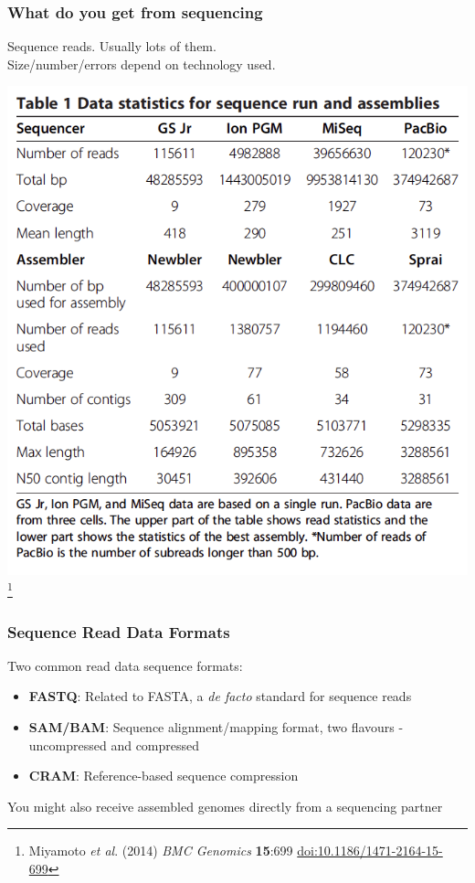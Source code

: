 
\begin{frame}
  \frametitle{What do you get from sequencing}
  Sequence reads. Usually lots of them. \\
  Size/number/errors depend on technology used.
    \begin{center}
      \includegraphics[height=0.6\textheight]{images/miyamoto_table}\footnote{\tiny{Miyamoto \textit{et al}. (2014) \textit{BMC Genomics} \textbf{15}:699 \href{http://dx.doi.org/10.1186/1471-2164-15-699}{doi:10.1186/1471-2164-15-699}}}
    \end{center}   
\end{frame}

\begin{frame}
  \frametitle{Sequence Read Data Formats}
  Two common read data sequence formats:
  \begin{itemize}
    \item \textbf{FASTQ}: Related to FASTA, a \textit{de facto} standard for sequence reads
    \item \textbf{SAM/BAM}: Sequence alignment/mapping format, two flavours - uncompressed and compressed
    \item \textbf{CRAM}: Reference-based sequence compression
  \end{itemize}
  You might also receive assembled genomes directly from a sequencing partner
\end{frame}

